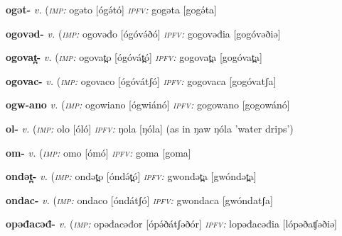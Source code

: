 {\newentry
\headword\textbf{ogət-}  
\ipa{[ogə́t-]}
\synpos\textit{v.} 
\imperative(\textit {\textsc{imp:}} ogəto [ógə́tó]
\imperfective\textit{\textsc{ipfv:}} gogəta [gogə́ta] 

\newentry
\headword\textbf{ogovəd-}  
\synpos\textit{v.} 
\imperative(\textit {\textsc{imp:}} ogovəđo [ógóvə́ðó]
\imperfective\textit{\textsc{ipfv:}} gogovəđia [gogóvəðiə]

\newentry
\headword\textbf{ogovat̪-}  
\synpos\textit{v.} 
\imperative(\textit {\textsc{imp:}} ogovat̪o [ógóvát̪ó]
\imperfective\textit{\textsc{ipfv:}} gogovat̪a [gogóvat̪a]

\newentry
\headword\textbf{ogovac-}  
\synpos\textit{v.} 
\imperative(\textit {\textsc{imp:}} ogovaco [ógóvátʃó]
\imperfective\textit{\textsc{ipfv:}} gogovaca [gogóvatʃa]

\newentry
\headword\textbf{ogw-ano}  
\synpos\textit{v.} 
\imperative(\textit {\textsc{imp:}} ogowiano [ógwiánó]
\imperfective\textit{\textsc{ipfv:}} gogowano [gogowánó] %

\newentry
\headword\textbf{ol-}  
\ipa{[ól-]}
\synpos\textit{v.} 
\imperative(\textit {\textsc{imp:}} olo [óló]
\imperfective\textit{\textsc{ipfv:}} ŋola [ŋóla] (as in ŋaw ŋóla 'water drips')

\newentry
\headword\textbf{om-}  
\ipa{[om-]}
\synpos\textit{v.} 
\imperative(\textit {\textsc{imp:}} omo [ómó]
\imperfective\textit{\textsc{ipfv:}} goma [goma]

\newentry
\headword\textbf{ondət̪-}  
\ipa{[óndət̪-]}
\synpos\textit{v.} 
\imperative(\textit {\textsc{imp:}} ondət̪o [óndə́t̪ó]
\imperfective\textit{\textsc{ipfv:}} gwondət̪a [gwóndət̪a]

\newentry
\headword\textbf{ondac-}  
\ipa{[óndatʃ-]}
\synpos\textit{v.} 
\imperative(\textit {\textsc{imp:}} ondaco [óndátʃó]
\imperfective\textit{\textsc{ipfv:}} gwondaca [gwóndatʃa]

\newentry
\headword\textbf{opəđacəđ-}  
\ipa{[ópəðatʃəð-]}
\synpos\textit{v.} 
\imperative(\textit {\textsc{imp:}} opəđacəđor [ópə́ðátʃəðór]
\imperfective\textit{\textsc{ipfv:}} lopəđacəđia [lópəðaʧəðiə]

}
